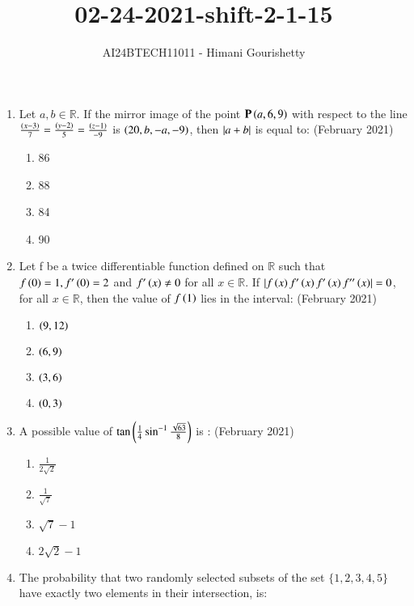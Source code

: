 \documentclass[journal,12pt,onecolumn]{IEEEtran}
\theoremstyle{remark}
\begin{document}

\vspace{3cm}

\title{02-24-2021-shift-2-1-15}
\author{AI24BTECH11011 - Himani Gourishetty}
\maketitle
\bigskip

\renewcommand{\thefigure}{\theenumi}
\renewcommand{\thetable}{\theenumi}
\begin{enumerate}
	\item Let $a,b \in \mathbb{R}$. If the mirror image of the point $\mathbf{P}\left(a,6,9\right)$ with respect to the line $\frac{\left(x-3\right)}{7}=\frac{\left(y-2\right)}{5}=\frac{\left(z-1\right)}{-9}$ is $\left(20,b,-a,-9\right)$, then $\left\vert a+b\right\vert$ is equal to:
		\hfill{(February 2021)}
		\begin{enumerate}
        \item 86
        \item 88
        \item 84
        \item 90
    \end{enumerate}
    \item Let f be a twice differentiable function defined on $\mathbb{R}$ such that $f\left(0\right)=1,f^{\prime}\left(0\right)=2$ and $f^{\prime}\left(x\right)\neq0$ for all $x \in\mathbb{R}$. If $\left\vert f\left(x\right)f^{\prime}\left(x\right)f^{\prime}\left(x\right)f''\left(x\right)\right\vert=0$, for all $x \in \mathbb{R}$, then the value of $f\left(1\right)$ lies in the interval:
    \hfill{(February 2021)} 
	\begin{enumerate}
        \item $\left(9,12\right)$
        \item $\left(6,9\right)$
        \item $\left(3,6\right)$
        \item $\left(0,3\right)$
    \end{enumerate}
    \item A possible value of $\tan\left(\frac{1}{4}\sin^{-1}\frac{\sqrt{63}}{8}\right)$ is :
    \hfill{(February 2021)} 
	\begin{enumerate}
        \item $\frac{1}{2\sqrt{2}}$
        \item $\frac{1}{\sqrt{7}}$
        \item $\sqrt{7}-1$
        \item $2\sqrt{2}-1$
    \end{enumerate}
    \item The probability that two randomly selected subsets of the set $\{1,2,3,4,5\}$ have exactly two elements in their intersection, is:

\end{enumerate}
\end{document}
